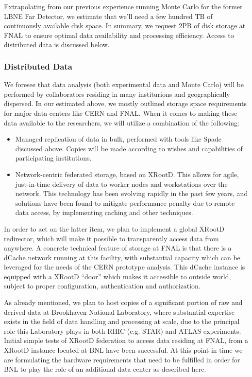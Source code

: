 Extrapolating from our previous experience running Monte Carlo for the former LBNE Far Detector, we estimate that we'll need a few hundred TB of continuously available
disk space. In summary, we request 2PB of disk storage at FNAL to ensure optimal data availability and processing efficiency. Access to distributed data is discussed below.

\subsubsection{Distributed Data}
We foresee that data analysis (both experimental data and Monte Carlo) will be performed by collaborators residing in many institurions and geographically dispersed. In our
estimated above, we mostly outlined storage space requirements for major data centers like CERN and FNAL. When it comes to making these data available to the researchers,
we will utilize a combination of the following:
\begin{itemize}
\item Managed replication of data in bulk, performed with tools like Spade discussed above. Copies will be made according to wishes and capabilities of participating institutions.
\item Network-centric federated storage, based on XRootD. This allows for agile, just-in-time delivery of data to worker nodes and workstations over the network. This
technology has been evolving rapidly in the past few years, and solutions have been found to mitigate performance penalty due to remote data access, by implementing caching
and other techniques.
\end{itemize}

In order to act on the latter item, we plan to implement a global XRootD redirector, which will make it possible to transparently access data from anywhere.
A concrete technical feature of storage at FNAL is that there is a dCache network running at this facility, with substantial capacity which can be leveraged
for the needs of the CERN prototype analysis. This dCache instance is equipped with a XRootD ``door'' which makes it accessible to outside world, subject
to proper configuration, authentication and authorization.

As already mentioned, we plan to host copies of a significant portion of raw and derived data at Brookhaven National Laboratory, where substantial expertise
exists in the field of data handling and processing at scale, due to the principal role this Laboratory plays in both RHIC (e.g. STAR) and ATLAS experiments.
Initial simple tests of XRootD federation to access data residing at FNAL, from a XRootD instance located at BNL have been successful. At this point in time we
are formulating the hardware requirements that need to be fulfilled in order for BNL to play the role of an additional data center as described here.





%

